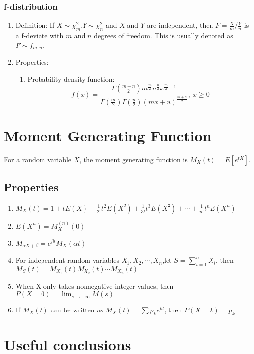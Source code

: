 \documentclass[a4paper]{article}
\begin{document}
	\subsubsection{f-distribution}
		\begin{enumerate}
		\item Definition: If $X\sim \chi_m^2$,$Y\sim \chi_n^2$ and $X$ and $Y$ are independent, then $F=\frac{X}{m}/\frac{Y}{n}$ is a f-deviate with $m$ and $n$ degrees of freedom. This is usually denoted as $F\sim f_{m,n}$.
		\item Properties:
			\begin{enumerate}
			\item Probability density function:
$$f(x)=\frac{\Gamma(\frac{m+n}{2})m^{\frac{m}{2}}n^{\frac{n}{2}}x^{\frac{m}{2}-1}}{\Gamma(\frac{m}{2})\Gamma(\frac{n}{2})(mx+n)^{\frac{m+n}{2}}},\ x\geq0$$
			\end{enumerate}
		\end{enumerate}


\section{Moment Generating Function}
For a random variable $X$, the moment generating function is $M_X(t)=E[e^{tX}]$.
\subsection{Properties}
\begin{enumerate}
\item $M_X(t)=1+tE(X)+\frac{1}{2!}t^2E(X^2)+\frac{1}{3!}t^3E(X^3)+\cdots+\frac{1}{n!}t^nE(X^n)$
\item $E(X^n)=M_X^{(n)}(0)$
\item $M_{\alpha X+\beta}=e^{\beta t}M_X(\alpha t)$
\item For independent random variables $X_1,X_2,\cdots,X_n$,let $S=\sum_{i=1}^nX_i$, then $M_S(t)=M_{X_1}(t)M_{X_2}(t)\cdots M_{X_n}(t)$
\item When X only takes nonnegative integer values, then $P(X=0)=\lim_{s\to -\infty}M(s)$
\item If $M_X(t)$ can be written as $M_X(t)=\sum p_ke^{kt}$, then $P(X=k)=p_k$
\end{enumerate}


\section{Useful conclusions}
\end{document}
